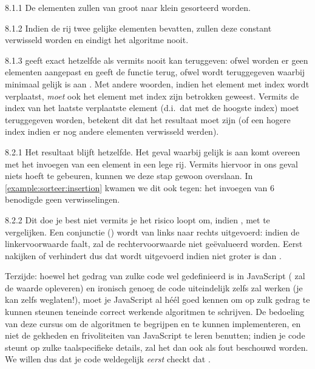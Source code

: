 \begin{Oplossing}{8.1.1}
De elementen zullen van groot naar klein gesorteerd worden.
\end{Oplossing}
\begin{Oplossing}{8.1.2}
Indien de rij twee gelijke elementen bevatten, zullen deze constant verwisseld
worden en eindigt het algoritme nooit.
\end{Oplossing}
\begin{Oplossing}{8.1.3}
 geeft exact hetzelfde als  vermits
 nooit 
kan teruggeven: ofwel worden er geen elementen aangepast en geeft de functie 
terug, ofwel wordt  teruggegeven waarbij  minimaal gelijk is aan .
Met andere woorden, indien het element met index  wordt verplaatst, \emph{moet} ook
het element met index  zijn betrokken geweest. Vermits de index van het laatste verplaatste element
(d.i.\ dat met de hoogste index) moet teruggegeven worden, betekent dit dat  het resultaat moet zijn
(of een hogere index indien er nog andere elementen verwisseld werden).
\end{Oplossing}
\begin{Oplossing}{8.2.1}
Het resultaat blijft hetzelfde. Het geval waarbij  gelijk is aan
 komt overeen met het invoegen van een element in een lege rij.
Vermits hiervoor in ons geval niets hoeft te gebeuren, kunnen we deze stap gewoon overslaan.
In \cref{example:sorteer:insertion} kwamen we dit ook tegen: het invoegen
van 6 benodigde geen verwisselingen.
\end{Oplossing}
\begin{Oplossing}{8.2.2}
Dit doe je best niet vermits je het risico loopt om, indien ,
 met  te vergelijken.
Een conjunctie (\inlinecode{&&}) wordt van links naar rechts uitgevoerd:
indien de linkervoorwaarde faalt, zal de rechtervoorwaarde niet ge\"evalueerd worden.
Eerst nakijken of  verhindert dus dat 
wordt uitgevoerd indien  niet groter is dan .

Terzijde: hoewel het gedrag
van zulke code wel gedefinieerd is in JavaScript ( zal de waarde 
opleveren) en ironisch genoeg de code uiteindelijk zelfs zal werken (je kan zelfs
 weglaten!), moet je JavaScript al h\'e\'el goed kennen
om op zulk gedrag te kunnen steunen teneinde correct werkende algoritmen te schrijven.
De bedoeling van deze cursus om de algoritmen te begrijpen en te kunnen implementeren,
en niet de gekheden en frivoliteiten van JavaScript te leren benutten;
indien je code steunt op zulke taalspecifieke details, zal het dan ook als fout beschouwd worden.
We willen dus dat je code weldegelijk \emph{eerst} checkt dat .
\end{Oplossing}
